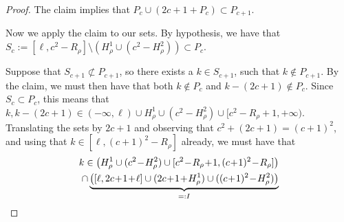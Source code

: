 \documentclass{article}
\numberwithin{equation}{section}
\theoremstyle{definition}
\begin{document}
\begin{proof}
The claim implies that $P_c \cup (2c+1 +P_c) \subset P_{c+1}$.

Now we apply the claim to our sets.  By hypothesis, we have that $S_c:= [ \ell , c^2 - R_\rho ] \setminus \left( H^1_{\rho} \cup (c^2 - H^2_\rho) \right) \subset P_c$. %



Suppose that $S_{c+1} \not \subset P_{c+1}$, so there exists a $k \in S_{c+1}$, such that $k \not \in P_{c+1}$. By the claim, we must then have that both $ k \not \in P_c$ and $k-(2c+1) \not \in P_c$. Since $S_c \subset P_c$, this means that $k , k-(2c+1) \in (-\infty,\ell) \cup H_\rho^1 \cup (c^2 - H^2_\rho) \cup [c^2 -R_\rho+1, +\infty)$. Translating the sets by $2c+1$ and observing that $c^2+(2c+1)=(c+1)^2$, and using that $ k \in [\ell, (c+1)^2-R_\rho]$ already, we must have that 
\begin{eqnarray}\label{eq:sets}
 k \in \left(  H^1_\rho \cup (c^2 \! - \! H^2_\rho) \cup [c^2\!-\! R_\rho\!+\! 1,(c\!+\!1)^2\!-\!R_\rho] \right)  
 \\ \cap \underbrace{ \left( [\ell,2c\!+\!1\!+\!\ell]\cup  (2c\!+\!1\!+\! H^1_\rho) \cup ((c\!+\!1)^2\! -\! H^2_\rho) \right) }_{=:I} \notag
 \end{eqnarray}


\end{proof}
\end{document}
